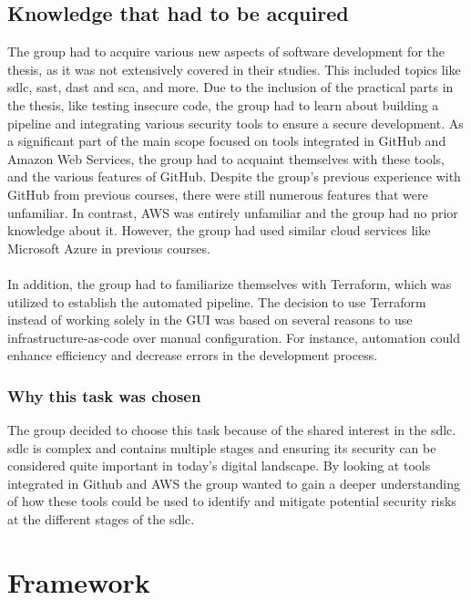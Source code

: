 \subsection{Knowledge that had to be acquired}
\label{section: Knowledge that had to be acquired}
The group had to acquire various new aspects of software development for the thesis, as it was not extensively covered in their studies. This included topics like \acrshort{sdlc}, \acrlong{sast}, \acrlong{dast} and \acrlong{sca}, and more. Due to the inclusion of the practical parts in the thesis, like testing insecure code, the group had to learn about building a pipeline and integrating various security tools to ensure a secure development. As a significant part of the main scope focused on tools integrated in GitHub and Amazon Web Services, the group had to acquaint themselves with these tools, and the various features of GitHub. Despite the group's previous experience with GitHub from previous courses, there were still numerous features that were unfamiliar. In contrast, AWS was entirely unfamiliar and the group had no prior knowledge about it. However, the group had used similar cloud services like Microsoft Azure in previous courses.
\\~\\
In addition, the group had to familiarize themselves with Terraform, which was utilized to establish the automated pipeline. The decision to use Terraform instead of working solely in the GUI was based on several reasons to use infrastructure-as-code over manual configuration. For instance, automation could enhance efficiency and decrease errors in the development process.

\subsubsection{Why this task was chosen}
The group decided to choose this task because of the shared interest in the \acrlong{sdlc}. \acrshort{sdlc} is complex and contains multiple stages and ensuring its security can be considered quite important in today's digital landscape. By looking at tools integrated in Github and AWS the group wanted to gain a deeper understanding of how these tools could be used to identify and mitigate potential security risks at the different stages of the \acrshort{sdlc}.

\newpage
\section{Framework}

